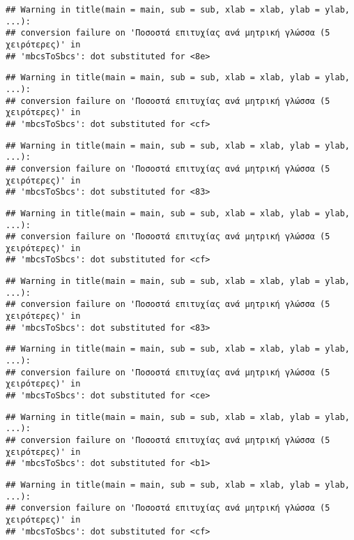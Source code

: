 \documentclass[
]{article}
\begin{document}
\begin{verbatim}
## Warning in title(main = main, sub = sub, xlab = xlab, ylab = ylab, ...):
## conversion failure on 'Ποσοστά επιτυχίας ανά μητρική γλώσσα (5 χειρότερες)' in
## 'mbcsToSbcs': dot substituted for <8e>
\end{verbatim}

\begin{verbatim}
## Warning in title(main = main, sub = sub, xlab = xlab, ylab = ylab, ...):
## conversion failure on 'Ποσοστά επιτυχίας ανά μητρική γλώσσα (5 χειρότερες)' in
## 'mbcsToSbcs': dot substituted for <cf>
\end{verbatim}

\begin{verbatim}
## Warning in title(main = main, sub = sub, xlab = xlab, ylab = ylab, ...):
## conversion failure on 'Ποσοστά επιτυχίας ανά μητρική γλώσσα (5 χειρότερες)' in
## 'mbcsToSbcs': dot substituted for <83>
\end{verbatim}

\begin{verbatim}
## Warning in title(main = main, sub = sub, xlab = xlab, ylab = ylab, ...):
## conversion failure on 'Ποσοστά επιτυχίας ανά μητρική γλώσσα (5 χειρότερες)' in
## 'mbcsToSbcs': dot substituted for <cf>
\end{verbatim}

\begin{verbatim}
## Warning in title(main = main, sub = sub, xlab = xlab, ylab = ylab, ...):
## conversion failure on 'Ποσοστά επιτυχίας ανά μητρική γλώσσα (5 χειρότερες)' in
## 'mbcsToSbcs': dot substituted for <83>
\end{verbatim}

\begin{verbatim}
## Warning in title(main = main, sub = sub, xlab = xlab, ylab = ylab, ...):
## conversion failure on 'Ποσοστά επιτυχίας ανά μητρική γλώσσα (5 χειρότερες)' in
## 'mbcsToSbcs': dot substituted for <ce>
\end{verbatim}

\begin{verbatim}
## Warning in title(main = main, sub = sub, xlab = xlab, ylab = ylab, ...):
## conversion failure on 'Ποσοστά επιτυχίας ανά μητρική γλώσσα (5 χειρότερες)' in
## 'mbcsToSbcs': dot substituted for <b1>
\end{verbatim}

\begin{verbatim}
## Warning in title(main = main, sub = sub, xlab = xlab, ylab = ylab, ...):
## conversion failure on 'Ποσοστά επιτυχίας ανά μητρική γλώσσα (5 χειρότερες)' in
## 'mbcsToSbcs': dot substituted for <cf>
\end{verbatim}
\end{document}
